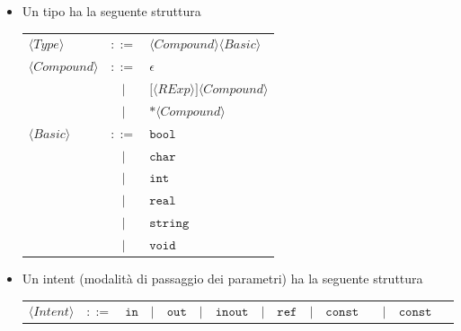 \documentclass{report}
\newcommand{\nonterm}[1]{\langle #1 \rangle}
\newcommand{\term}[1]{\texttt{#1}}
\begin{document}
\begin{itemize}
    \item Un tipo ha la seguente struttura
        \begin{center}
        \begin{tabular}{l c l}
        $\nonterm{Type}$        &   $::=$   &   $\nonterm{Compound} \nonterm{Basic}$                    \\
        $\nonterm{Compound}$    &   $::=$   &   $\epsilon$                                              \\
                                &    $|$    &   $\term{[} \nonterm{RExp} \term{]} \nonterm{Compound}$   \\
                                &    $|$    &   $\term{*} \nonterm{Compound}$                           \\
        $\nonterm{Basic}$       &   $::=$   &   $\term{bool}$                                           \\
                                &    $|$    &   $\term{char}$                                           \\
                                &    $|$    &   $\term{int}$                                            \\
                                &    $|$    &   $\term{real}$                                           \\
                                &    $|$    &   $\term{string}$                                         \\
                                &    $|$    &   $\term{void}$

        \end{tabular}
        \end{center}

    \item Un intent (modalità di passaggio dei parametri) ha la seguente struttura
        \begin{center}
        \begin{tabular}{*{13}c}
        $\nonterm{Intent}$      &   $::=$   &   $\term{in}$                                           
                                &    $|$    &   $\term{out}$                                          
                                &    $|$    &   $\term{inout}$                                        
                                &    $|$    &   $\term{ref}$                                          
                                &    $|$    &   $\term{const in}$                                     
                                &    $|$    &   $\term{const ref}$


\end{tabular}
\end{center}
\end{itemize}
\end{document}
